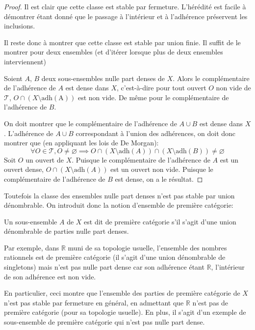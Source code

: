 \begin{proof}
  Il est clair que cette classe est stable par fermeture. L'hérédité est
  facile à démontrer étant donné que le passage à l'intérieur et à l'adhérence
  préservent les inclusions.

  Il reste donc à montrer que cette classe est stable par union finie.
  Il suffit de le montrer pour deux ensembles (et d'itérer lorsque plus de
  deux ensembles interviennent)

  Soient
  $A$, $B$ deux sous-ensembles nulle part denses de $X$. Alors le complémentaire
  de l'adhérence de $A$ est dense dans $X$, c'est-à-dire pour tout ouvert $O$ non vide
  de $\mathcal{T}$, $O\cap (X\setminus \mathrm{adh(A)})$ est non vide. De même
  pour le complémentaire de l'adhérence de $B$.

  On doit montrer que le complémentaire de l'adhérence de $A\cup B$ est dense
  dans $X$. L'adhérence de $A\cup B$ correspondant à l'union des adhérences,
  on doit donc montrer que (en appliquant les lois de De Morgan):
  $$\forall O \in \mathcal{T}, O\neq \varnothing\implies
  O \cap (X\setminus \mathrm{adh}(A))\cap (X\setminus \mathrm{adh}(B))\neq\varnothing$$
  Soit $O$ un ouvert de $X$.
  Puisque le complémentaire de l'adhérence de $A$ est un ouvert dense,
  $O\cap (X\setminus \mathrm{adh}(A))$ est un ouvert non vide. Puisque
  le complémentaire de l'adhérence de $B$ est dense, on a le résultat.
\end{proof}

Toutefois la classe des ensembles nulle part denses n'est pas stable par union
dénombrable. On introduit donc la notion d'ensemble de première catégorie:

\begin{df}
  Un sous-ensemble $A$ de $X$ est dit de première catégorie s'il s'agit d'une
  union dénombrable de parties nulle part denses.
\end{df}

Par exemple, dans $\mathbb{R}$ muni de sa topologie usuelle, l'ensemble
des nombres rationnels est de première catégorie (il s'agit d'une union
dénombrable de singletons) mais n'est pas nulle part dense car son
adhérence étant $\mathbb{R}$, l'intérieur de son adhérence est non vide.

En particulier, ceci montre que l'ensemble des parties de première
catégorie de $X$ n'est pas stable par fermeture en général, en admettant
que $\mathbb{R}$ n'est pas de première catégorie (pour sa topologie usuelle).
En plus, il s'agit d'un exemple de sous-ensemble de première catégorie qui
n'est pas nulle part dense.

